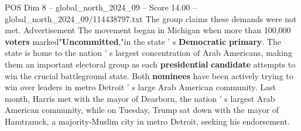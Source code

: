 \begin{textsample}{POS Dim 8 – global\_north\_2024\_09 – Score 14.00 – global\_north\_2024\_09/114438797.txt}
The group claims these demands were not met.
Advertisement The movement began in Michigan when more than 100,000 \textbf{voters} marked"\textbf{Uncommitted},"in the state ' s \textbf{Democratic} \textbf{primary}.
The state is home to the nation ' s largest concentration of Arab Americans, making them an important electoral group as each \textbf{presidential} \textbf{candidate} attempts to win the crucial battleground state.
Both \textbf{nominees} have been actively trying to win over leaders in metro Detroit ' s large Arab American community.
Last month, Harris met with the mayor of Dearborn, the nation ' s largest Arab American community, while on Tuesday, Trump sat down with the mayor of Hamtramck, a majority-Muslim city in metro Detroit, seeking his endorsement.

\end{textsample}
